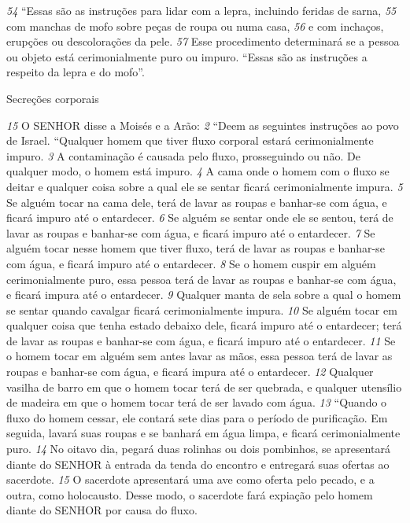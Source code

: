 \smallskip
\textit{\tiny 54}
“Essas são as instruções para lidar com a lepra, incluindo feridas de sarna,
\textit{\tiny 55}
com manchas de mofo sobre peças de roupa ou numa casa, 
\textit{\tiny 56}
e com inchaços,
erupções ou descolorações da pele. 
\textit{\tiny 57}
Esse procedimento determinará se a pessoa
ou objeto está cerimonialmente puro ou impuro.
   “Essas são as instruções a respeito da lepra e do mofo”.


\bigskip
Secreções corporais
   
\textit{\tiny 15}
 O SENHOR disse a Moisés e a Arão: 
\textit{\tiny 2} 
“Deem as seguintes instruções ao povo
de Israel.
   “Qualquer homem que tiver fluxo corporal estará cerimonialmente impuro. 
\textit{\tiny 3} 
A contaminação é causada pelo fluxo, prosseguindo ou não. De qualquer modo, o
homem está impuro. 
\textit{\tiny 4} 
A cama onde o homem com o fluxo se deitar e qualquer
coisa sobre a qual ele se sentar ficará cerimonialmente impura. 
\textit{\tiny 5} 
Se alguém tocar
na cama dele, terá de lavar as roupas e banhar-se com água, e ficará impuro até o
entardecer. 
\textit{\tiny 6} 
Se alguém se sentar onde ele se sentou, terá de lavar as roupas e
banhar-se com água, e ficará impuro até o entardecer. 
\textit{\tiny 7} 
Se alguém tocar nesse
homem que tiver fluxo, terá de lavar as roupas e banhar-se com água, e ficará
impuro até o entardecer. 
\textit{\tiny 8} 
Se o homem cuspir em alguém cerimonialmente puro,
essa pessoa terá de lavar as roupas e banhar-se com água, e ficará impura até o
entardecer. 
\textit{\tiny 9} 
Qualquer manta de sela sobre a qual o homem se sentar quando
cavalgar ficará cerimonialmente impura. 
\textit{\tiny 10}
Se alguém tocar em qualquer coisa
que tenha estado debaixo dele, ficará impuro até o entardecer; terá de lavar as
roupas e banhar-se com água, e ficará impuro até o entardecer. 
\textit{\tiny 11}
Se o homem
tocar em alguém sem antes lavar as mãos, essa pessoa terá de lavar as roupas e
banhar-se com água, e ficará impura até o entardecer. 
\textit{\tiny 12}
Qualquer vasilha de
barro em que o homem tocar terá de ser quebrada, e qualquer utensílio de
madeira em que o homem tocar terá de ser lavado com água.
\textit{\tiny 13}
“Quando o fluxo do homem cessar, ele contará sete dias para o período de
purificação. Em seguida, lavará suas roupas e se banhará em água limpa, e ficará
cerimonialmente puro. 
\textit{\tiny 14}
No oitavo dia, pegará duas rolinhas ou dois pombinhos,
se apresentará diante do SENHOR à entrada da tenda do encontro e entregará suas
ofertas ao sacerdote. 
\textit{\tiny 15}
O sacerdote apresentará uma ave como oferta pelo
pecado, e a outra, como holocausto. Desse modo, o sacerdote fará expiação pelo
homem diante do SENHOR por causa do fluxo.
   
